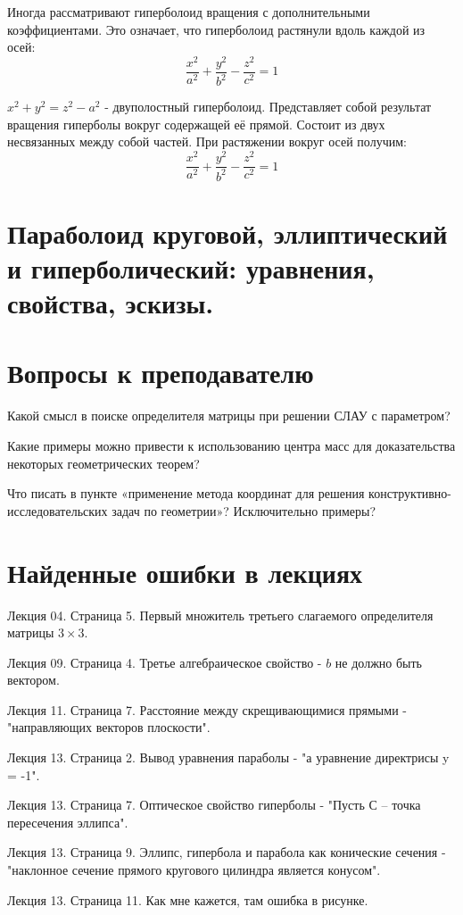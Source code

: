 \documentclass[12pt]{article}
\begin{document}
\begin{sloppypar}
    Иногда рассматривают гиперболоид вращения с дополнительными коэффициентами. Это означает, что гиперболоид растянули вдоль каждой из осей:
    \[
        \dfrac{x^2}{a^2} + \dfrac{y^2}{b^2} - \dfrac{z^2}{c^2} = 1
    \]

    $x^2 + y^2 = z^2 - a^2$ - двуполостный гиперболоид. Представляет собой результат вращения гиперболы вокруг содержащей её прямой. Состоит из двух несвязанных между собой частей. При растяжении вокруг осей получим:
    \[
        \dfrac{x^2}{a^2} + \dfrac{y^2}{b^2} - \dfrac{z^2}{c^2} = 1
    \]

    \section{Параболоид круговой, эллиптический и гиперболический: уравнения, свойства, эскизы.}


    \section{Вопросы к преподавателю}
    Какой смысл в поиске определителя матрицы при решении СЛАУ с параметром?

    Какие примеры можно привести к использованию центра масс для доказательства некоторых геометрических теорем?

    Что писать в пункте «применение метода координат для решения конструктивно-исследовательских задач по геометрии»? Исключительно примеры?

    \section{Найденные ошибки в лекциях}
    Лекция 04. Страница 5. Первый множитель третьего слагаемого определителя матрицы $3 \times 3$.

    Лекция 09. Страница 4. Третье алгебраическое свойство - $b$ не должно быть вектором.

    Лекция 11. Страница 7. Расстояние между скрещивающимися прямыми - "направляющих векторов плоскости".

    Лекция 13. Страница 2. Вывод уравнения параболы - "а уравнение директрисы y = -1".

    Лекция 13. Страница 7. Оптическое свойство гиперболы - "Пусть С – точка пересечения эллипса".

    Лекция 13. Страница 9. Эллипс, гипербола и парабола как конические сечения - "наклонное сечение прямого кругового цилиндра является конусом".

    Лекция 13. Страница 11. Как мне кажется, там ошибка в рисунке.
\end{sloppypar}
\end{document}
